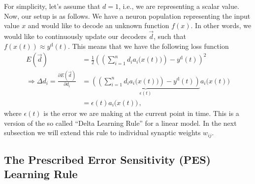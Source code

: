 \documentclass[10pt,letterpaper,oneside]{article}
\begin{document}
For simplicity, let's assume that $d = 1$, i.e., we are representing a scalar value. Now, our setup is as follows. We have a neuron population representing the input value $x$ and would like to decode an unknown function $f(x)$. In other words, we would like to continuously update our decoders $\vec d$, such that $f(x(t)) \approx y^\mathrm{d}(t)$. This means that we have the following loss function
\begin{align*}
	E(\vec d) &= \frac{1}2 \left(\left(\sum_{i = 1}^n d_i a_i\big(x(t)\big) \right) - y^\mathrm{d}(t) \right)^2 \\
	\Rightarrow \Delta d_i = \frac{\partial E(\vec d)}{\partial d_i} &= \underbrace{\left(\left(\sum_{i = 1}^n d_i a_i\big(x(t)\big) \right) - y^\mathrm{d}(t)\right)}_{\epsilon(t)} a_i\big(x(t)\big) \\
		&= \epsilon(t) a_i\big(x(t)\big) \,,
\end{align*}
where $\epsilon(t)$ is the error we are making at the current point in time. This is a version of the so called \enquote{Delta Learning Rule} for a linear model. In the next subsection we will extend this rule to individual synaptic weights $w_{ij}$.



\subsection{The Prescribed Error Sensitivity (PES) Learning Rule}
\end{document}
